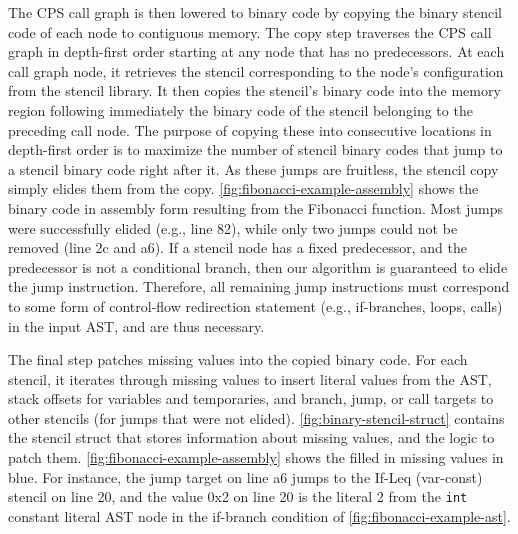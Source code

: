 \documentclass[acmsmall,nonacm,screen]{acmart}\settopmatter{printfolios=true,printccs=true,printacmref=false}
\newcommand{\figref}[1]{\autoref{#1}}
\newcommand\code[1]{\lstinline[mathescape=true,basicstyle=\ttfamily\normalsize]|#1|}
\begin{document}
The CPS call graph is then lowered to binary code by copying the binary stencil code of each node to contiguous memory. The copy step traverses the CPS call graph in depth-first order starting at any node that has no predecessors. At each call graph node, it retrieves the stencil corresponding to the node's configuration from the stencil library. It then copies the stencil's binary code into the memory region following immediately the binary code of the stencil belonging to the preceding call node. The purpose of copying these into consecutive locations in depth-first order is to maximize the number of stencil binary codes that jump to a stencil binary code right after it. As these jumps are fruitless, the stencil copy simply elides them from the copy. \figref{fig:fibonacci-example-assembly} shows the binary code in assembly form resulting from the Fibonacci function. Most jumps were successfully elided (e.g., line 82), while only two jumps could not be removed (line 2c and a6). If a stencil node has a fixed predecessor, and the predecessor is not a conditional branch, then our algorithm is guaranteed to elide the jump instruction. Therefore, all remaining jump instructions must correspond to some form of control-flow redirection statement (e.g., if-branches, loops, calls) in the input AST, and are thus necessary. 

The final step patches missing values into the copied binary code. For each stencil, it iterates through missing values to insert literal values from the AST, stack offsets for variables and temporaries, and branch, jump, or call targets to other stencils (for jumps that were not elided). \figref{fig:binary-stencil-struct} contains the stencil struct that stores information about missing values, and the logic to patch them. \figref{fig:fibonacci-example-assembly} shows the filled in missing values in blue. For instance, the jump target on line a6 jumps to the If-Leq (var-const) stencil on line 20, and the value 0x2 on line 20 is the literal 2 from the \code{int} constant literal AST node in the if-branch condition of \figref{fig:fibonacci-example-ast}.
\end{document}
